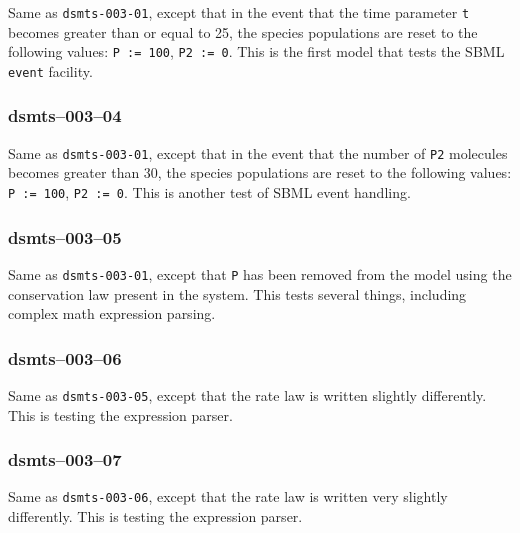  Same as \verb$dsmts-003-01$, except
that in the event that the time parameter \verb$t$ becomes greater than or
equal to 25, the species populations are reset to the following
values: \verb$P := 100$, \verb$P2 := 0$. This is the first model that
tests the SBML \verb$event$ facility.


\subsubsection{dsmts--003--04}

 Same as \verb$dsmts-003-01$, except that in the event
that the number of \verb$P2$ molecules becomes greater than 30, the species
populations are reset to the following values: \verb$P := 100$,
\verb$P2 := 0$. This is another test of SBML event handling.


\subsubsection{dsmts--003--05}

 Same as \verb$dsmts-003-01$, except that \verb$P$ has been removed
from the model using the conservation law present in the system. This
tests several things, including complex math expression parsing.


\subsubsection{dsmts--003--06}

 Same as \verb$dsmts-003-05$, except that the rate law is written
slightly differently. This is testing the expression parser.


\subsubsection{dsmts--003--07}

 Same as \verb$dsmts-003-06$, except that the rate law is written
very slightly differently. This is testing the expression parser.











